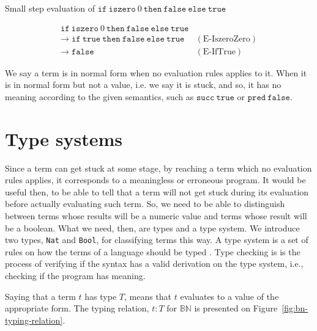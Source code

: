 \begin{example}
    \label{fig:bn-small-step-example}
    Small step evaluation of \(\texttt{if}\:\texttt{iszero}\:0\:\texttt{then}\:\texttt{false}\:\texttt{else}\:\texttt{true}\)

    \[
        \begin{array}{ll}
            \texttt{if}\:\texttt{iszero}\:0\:\texttt{then}\:\texttt{false}\:\texttt{else}\:\texttt{true} & \\
            \rightarrow\; \texttt{if}\:\texttt{true}\:\texttt{then}\:\texttt{false}\:\texttt{else}\:\texttt{true} & (\text{E-IszeroZero}) \\
            \rightarrow\; \texttt{false} & (\text{E-IfTrue})
        \end{array}
    \]
\end{example}

We say a term is in normal form when no evaluation rules applies to it.
When it is in normal form but not a value, i.e. we say it is stuck, and 
so, it has no meaning according to the given semantics, such as 
\(\texttt{succ}\:\texttt{true}\) or \(\texttt{pred}\:\texttt{false}\).

\section{Type systems}\label{sec:type-systems}

Since a term can get stuck at some stage, by reaching a term which no evaluation 
rules applies, it corresponds to a meaningless or erroneous program. It would be
useful then, to be able to tell that a term will not get stuck during its evaluation
before actually evaluating such term. So, we need to be able to distinguish between
terms whose results will be a numeric value and terms whose result will be a boolean.
What we need, then, are types and a type system. We introduce two types, \texttt{Nat}
and \texttt{Bool}, for classifying terms this way. A type system is a set of rules on 
how the terms of a language should be typed
. Type checking is is the process of verifying if the syntax has a valid derivation
on the type system, i.e., checking if the program has meaning.

Saying that a term \(t\) has type \(T\), means that \(t\) evaluates to a value 
of the appropriate form. The typing relation, \(t : T\) for \(\mathbb{B}\mathbb{N}\) 
is presented on Figure~\ref{fig:bn-typing-relation}.

